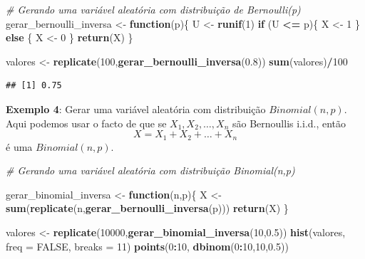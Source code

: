 \documentclass[
]{book}
\newenvironment{Shaded}{\begin{snugshade}}{\end{snugshade}}
\newcommand{\AttributeTok}[1]{\textcolor[rgb]{0.13,0.29,0.53}{#1}}
\newcommand{\CommentTok}[1]{\textcolor[rgb]{0.56,0.35,0.01}{\textit{#1}}}
\newcommand{\ConstantTok}[1]{\textcolor[rgb]{0.56,0.35,0.01}{#1}}
\newcommand{\ControlFlowTok}[1]{\textcolor[rgb]{0.13,0.29,0.53}{\textbf{#1}}}
\newcommand{\DecValTok}[1]{\textcolor[rgb]{0.00,0.00,0.81}{#1}}
\newcommand{\FloatTok}[1]{\textcolor[rgb]{0.00,0.00,0.81}{#1}}
\newcommand{\FunctionTok}[1]{\textcolor[rgb]{0.13,0.29,0.53}{\textbf{#1}}}
\newcommand{\NormalTok}[1]{#1}
\newcommand{\OtherTok}[1]{\textcolor[rgb]{0.56,0.35,0.01}{#1}}
\newcommand{\SpecialCharTok}[1]{\textcolor[rgb]{0.81,0.36,0.00}{\textbf{#1}}}
\begin{document}
\begin{Shaded}
\begin{Highlighting}[]
\CommentTok{\# Gerando uma variável aleatória com distribuição de Bernoulli(p)}
\NormalTok{gerar\_bernoulli\_inversa }\OtherTok{\textless{}{-}} \ControlFlowTok{function}\NormalTok{(p)\{}
\NormalTok{  U }\OtherTok{\textless{}{-}} \FunctionTok{runif}\NormalTok{(}\DecValTok{1}\NormalTok{)}
  \ControlFlowTok{if}\NormalTok{ (U }\SpecialCharTok{\textless{}=}\NormalTok{ p)\{}
\NormalTok{    X }\OtherTok{\textless{}{-}} \DecValTok{1}
\NormalTok{  \} }\ControlFlowTok{else}\NormalTok{ \{}
\NormalTok{    X }\OtherTok{\textless{}{-}} \DecValTok{0}
\NormalTok{  \}}
  \FunctionTok{return}\NormalTok{(X)}
\NormalTok{\}}

\NormalTok{valores }\OtherTok{\textless{}{-}} \FunctionTok{replicate}\NormalTok{(}\DecValTok{100}\NormalTok{,}\FunctionTok{gerar\_bernoulli\_inversa}\NormalTok{(}\FloatTok{0.8}\NormalTok{))}
\FunctionTok{sum}\NormalTok{(valores)}\SpecialCharTok{/}\DecValTok{100}
\end{Highlighting}
\end{Shaded}

\begin{verbatim}
## [1] 0.75
\end{verbatim}

\textbf{Exemplo 4}: Gerar uma variável aleatória com distribuição
\(Binomial(n,p)\). Aqui podemos usar o facto de que se
\(X_{1},X_{2},\ldots,X_{n}\) são Bernoullis i.i.d., então
\[X = X_{1}+X_{2}+\ldots+X_{n}\] é uma \(Binomial(n,p)\).

\begin{Shaded}
\begin{Highlighting}[]
\CommentTok{\# Gerando uma variável aleatória com distribuição Binomial(n,p)}

\NormalTok{gerar\_binomial\_inversa }\OtherTok{\textless{}{-}} \ControlFlowTok{function}\NormalTok{(n,p)\{}
\NormalTok{  X }\OtherTok{\textless{}{-}} \FunctionTok{sum}\NormalTok{(}\FunctionTok{replicate}\NormalTok{(n,}\FunctionTok{gerar\_bernoulli\_inversa}\NormalTok{(p)))}
  \FunctionTok{return}\NormalTok{(X)}
\NormalTok{\}}

\NormalTok{valores }\OtherTok{\textless{}{-}} \FunctionTok{replicate}\NormalTok{(}\DecValTok{10000}\NormalTok{,}\FunctionTok{gerar\_binomial\_inversa}\NormalTok{(}\DecValTok{10}\NormalTok{,}\FloatTok{0.5}\NormalTok{))}
\FunctionTok{hist}\NormalTok{(valores, }\AttributeTok{freq =} \ConstantTok{FALSE}\NormalTok{, }\AttributeTok{breaks =} \DecValTok{11}\NormalTok{)}
\FunctionTok{points}\NormalTok{(}\DecValTok{0}\SpecialCharTok{:}\DecValTok{10}\NormalTok{, }\FunctionTok{dbinom}\NormalTok{(}\DecValTok{0}\SpecialCharTok{:}\DecValTok{10}\NormalTok{,}\DecValTok{10}\NormalTok{,}\FloatTok{0.5}\NormalTok{))}
\end{Highlighting}
\end{Shaded}
\end{document}
